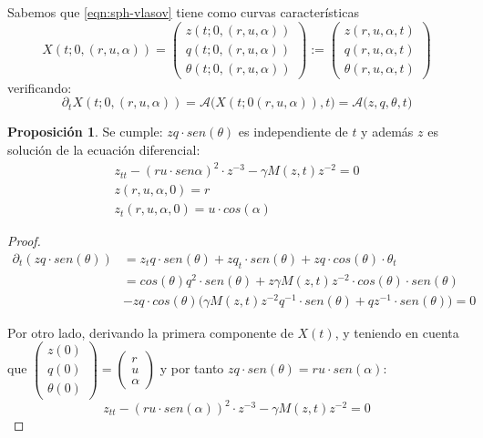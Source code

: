 \documentclass[a4paper,10pt]{scrartcl}
\theoremstyle{definition}
\newtheorem{fact}{Proposición}
\numberwithin{equation}{section}
\begin{document}
Sabemos que \eqref{eqn:sph-vlasov} tiene como curvas características 
\[
 X(t; 0, (r,u,\alpha)) = 
    \left(\begin{array}{c} 
       z(t; 0, (r, u, \alpha))\\ q(t; 0, (r, u, \alpha))\\ \theta(t; 0, (r, u, \alpha))
    \end{array}\right) :=
    \left(\begin{array}{c} 
       z(r, u, \alpha, t)\\ q(r, u, \alpha, t)\\ \theta(r, u, \alpha, t)
    \end{array}\right)
\]
verificando:
\begin{equation}
\label{eqn:sph-cc}
\partial_t X(t; 0,(r,u,\alpha)) = \mathcal{A}\big(X(t;0(r,u,\alpha)),t\big) = \mathcal{A}\big(z,q,\theta,t\big)
\end{equation}

\begin{fact} \label{fact:curves}
Se cumple:
 $zq \cdot sen(\theta)$ es independiente de $t$ y además $z$ es solución de la ecuación diferencial:
 \begin{align}
 z_{tt} - (ru \cdot sen\alpha)^2 \cdot z^{-3} - \gamma M(z,t) z^{-2} = 0\nonumber\\
 z(r,u,\alpha, 0) = r \nonumber\\
 z_t(r,u,\alpha,0) = u\cdot cos(\alpha)
 \label{eqn:curves}
 \end{align}
\end{fact}
\begin{proof}
 \begin{align*}
  \partial_t(zq \cdot sen(\theta)) &= z_t q\cdot sen(\theta) + zq_t \cdot sen(\theta) + zq \cdot cos(\theta) \cdot \theta_t \\
  &= cos(\theta) q^2 \cdot sen(\theta) + z\gamma M(z,t) z^{-2} \cdot cos(\theta) \cdot sen(\theta) \\
  &- zq \cdot cos(\theta) \Bigg(\gamma M(z,t) z^{-2} q^{-1} \cdot sen(\theta)  + qz^{-1}\cdot sen(\theta) \Bigg) = 0
 \end{align*}

Por otro lado, derivando la primera componente de $X(t)$, y teniendo en cuenta que $\left(\begin{array}{c} z(0)\\ q(0)\\ \theta(0) \end{array}\right) = 
\left(\begin{array}{c} r\\ u\\ \alpha\end{array}\right)$ y por tanto $zq\cdot sen(\theta) = ru\cdot sen(\alpha)$:
\begin{equation}
 z_{tt} - (ru \cdot sen(\alpha))^2 \cdot z^{-3} - \gamma M(z,t) z^{-2} = 0
\end{equation}
\end{proof}
\end{document}
